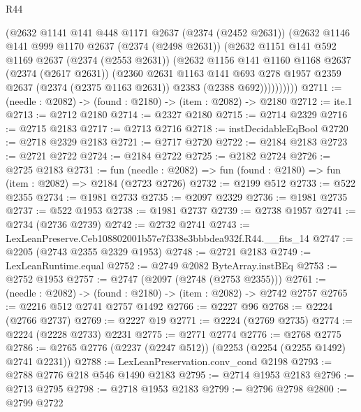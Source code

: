 \begin{lexlean}{R44}
\begin{coremodule}
            (@2632
              @1141
              @141
              @448
              @1171
              @2637
              (@2374 (@2452 @2631))
              (@2632
                @1146
                @141
                @999
                @1170
                @2637
                (@2374 (@2498 @2631))
                (@2632
                  @1151
                  @141
                  @592
                  @1169
                  @2637
                  (@2374 (@2553 @2631))
                  (@2632
                    @1156
                    @141
                    @1160
                    @1168
                    @2637
                    (@2374 (@2617 @2631))
                    (@2360
                      @2631
                      @1163
                      @141
                      @693
                      @278
                      @1957
                      @2359
                      @2637
                      (@2374 (@2375 @1163 @2631))
                      @2383
                      (@2388 @692))))))))))
@2711 := (needle : @2082) -> (found : @2180) -> (item : @2082) -> @2180
@2712 := ite.{1}
@2713 := @2712 @2180
@2714 := @2327 @2180
@2715 := @2714 @2329
@2716 := @2715 @2183
@2717 := @2713 @2716
@2718 := instDecidableEqBool
@2720 := @2718 @2329 @2183
@2721 := @2717 @2720
@2722 := @2184 @2183
@2723 := @2721 @2722
@2724 := @2184 @2722
@2725 := @2182 @2724
@2726 := @2725 @2183
@2731 := fun (needle : @2082) => fun (found : @2180) => fun (item : @2082) => @2184 (@2723 @2726)
@2732 := @2199 @512
@2733 := @522 @2355
@2734 := @1981 @2733
@2735 := @2097 @2329
@2736 := @1981 @2735
@2737 := @522 @1953
@2738 := @1981 @2737
@2739 := @2738 @1957
@2741 := @2734 (@2736 @2739)
@2742 := @2732 @2741
@2743 := LexLeanPreserve.Ceb108802001b57e7f338e3bbbdea932f.R44.__fits_14
@2747 := @2205 (@2743 @2355 @2329 @1953)
@2748 := @2721 @2183
@2749 := LexLeanRuntime.equal
@2752 := @2749 @2082 ByteArray.instBEq
@2753 := @2752 @1953
@2757 := @2747 (@2097 (@2748 (@2753 @2355)))
@2761 := (needle : @2082) -> (found : @2180) -> (item : @2082) -> @2742 @2757
@2765 := @2216 @512 @2741 @2757 @1492
@2766 := @2227 @96
@2768 := @2224 (@2766 @2737)
@2769 := @2227 @19
@2771 := @2224 (@2769 @2735)
@2774 := @2224 (@2228 @2733) @2231
@2775 := @2771 @2774
@2776 := @2768 @2775
@2786 := @2765 @2776 (@2237 (@2247 @512)) (@2253 (@2254 (@2255 @1492) @2741 @2231))
@2788 := LexLeanPreservation.conv_cond @2198
@2793 := @2788 @2776 @218 @546 @1490 @2183
@2795 := @2714 @1953 @2183
@2796 := @2713 @2795
@2798 := @2718 @1953 @2183
@2799 := @2796 @2798
@2800 := @2799 @2722

\end{coremodule}
\end{lexlean}
